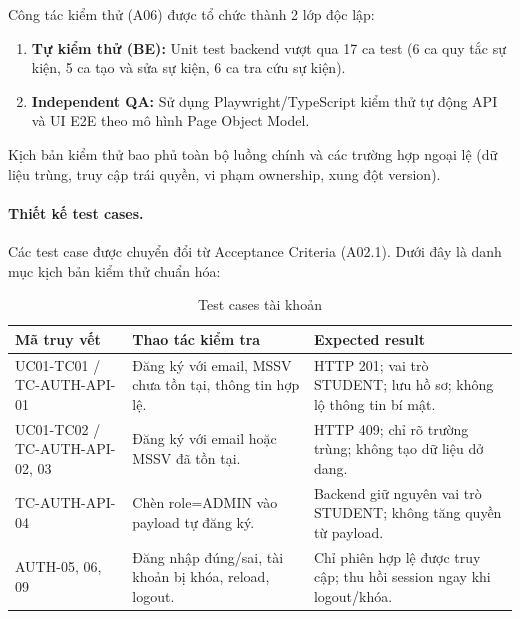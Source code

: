 Công tác kiểm thử (A06) được tổ chức thành 2 lớp độc lập:
\begin{enumerate}
    \item \textbf{Tự kiểm thử (BE):} Unit test backend vượt qua 17 ca test (6 ca quy tắc sự kiện, 5 ca tạo và sửa sự kiện, 6 ca tra cứu sự kiện).
    \item \textbf{Independent QA:} Sử dụng Playwright/TypeScript kiểm thử tự động API và UI E2E theo mô hình Page Object Model.
\end{enumerate}

Kịch bản kiểm thử bao phủ toàn bộ luồng chính và các trường hợp ngoại lệ (dữ liệu trùng, truy cập trái quyền, vi phạm ownership, xung đột version).

\paragraph{Thiết kế test cases.}
Các test case được chuyển đổi từ Acceptance Criteria (A02.1). Dưới đây là danh mục kịch bản kiểm thử chuẩn hóa:

\begin{table}[H]
\centering\small
\caption{Test cases tài khoản}\label{tab:i1-auth-cases}
\begin{tabularx}{\linewidth}{@{}p{.22\linewidth}XX@{}}
\toprule
\textbf{Mã truy vết} & \textbf{Thao tác kiểm tra} & \textbf{Expected result}\\\midrule
UC01-TC01 / TC-AUTH-API-01 & Đăng ký với email, MSSV chưa tồn tại, thông tin hợp lệ. & HTTP 201; vai trò STUDENT; lưu hồ sơ; không lộ thông tin bí mật.\\
UC01-TC02 / TC-AUTH-API-02, 03 & Đăng ký với email hoặc MSSV đã tồn tại. & HTTP 409; chỉ rõ trường trùng; không tạo dữ liệu dở dang.\\
TC-AUTH-API-04 & Chèn role=ADMIN vào payload tự đăng ký. & Backend giữ nguyên vai trò STUDENT; không tăng quyền từ payload.\\
AUTH-05, 06, 09 & Đăng nhập đúng/sai, tài khoản bị khóa, reload, logout. & Chỉ phiên hợp lệ được truy cập; thu hồi session ngay khi logout/khóa.\\
\bottomrule\end{tabularx}
\end{table}

